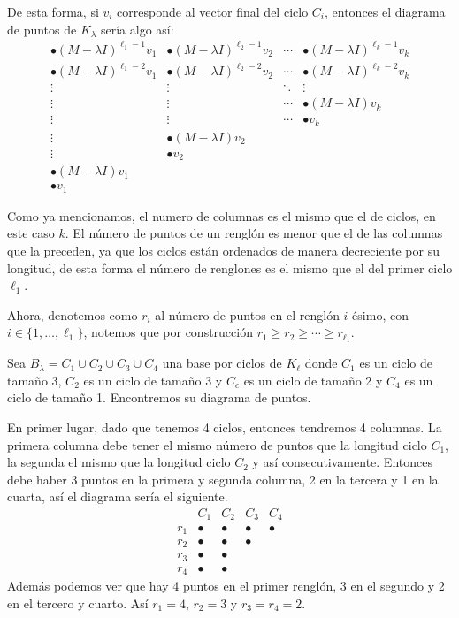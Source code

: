 De esta forma, si $v_i$ corresponde al vector final del ciclo $C_i$, entonces el diagrama de puntos de $K_\lambda
$ sería algo así:
\[
  \begin{array}{llll} 
    \bullet (M-\lambda I)^{\ell_1-1}v_1 & \bullet (M-\lambda I)^{\ell_2-1}v_2 & \cdots & \bullet (M-\lambda I)^{\ell_k-1}v_k  \\
    \bullet (M-\lambda I)^{\ell_1-2}v_1 & \bullet (M-\lambda I)^{\ell_2-2}v_2 & \cdots & \bullet (M-\lambda I)^{\ell_k-2}v_k  \\
    \vdots & \vdots & \ddots & \vdots \\
    \vdots & \vdots & \cdots & \bullet (M-\lambda I)v_k \\
    \vdots & \vdots & \cdots & \bullet v_k \\
    \vdots & \bullet (M-\lambda I)v_2 \\
    \vdots & \bullet v_2 \\
    \bullet (M-\lambda I)v_1 \\
    \bullet v_1 
  \end{array}
\]

Como ya mencionamos, el numero de columnas es el mismo que el de ciclos, en este caso $k$. El número de puntos de un renglón es menor que el de las columnas que la preceden, ya que los ciclos están ordenados de manera decreciente por su longitud, de esta forma el número de renglones es el mismo que el del primer ciclo $\ell_1$. 

Ahora, denotemos como $r_i$ al número de puntos en el renglón $i$-ésimo, con $i \in \{1,\ldots,\ell_1\}$, notemos que por construcción $r_1 \geq r_2 \geq \cdots \geq r_{\ell_1}$.

\begin{example}
  Sea $B_\lambda = C_1 \cup C_2 \cup C_3 \cup C_4$ una base por ciclos de $K_\ell$ donde $C_1$ es un ciclo de tamaño 3, $C_2$ es un ciclo de tamaño 3 y $C_c$ es un ciclo de tamaño 2 y $C_4$ es un ciclo de tamaño 1. Encontremos su diagrama de puntos.

  \examplesolution

  En primer lugar, dado que tenemos 4 ciclos, entonces tendremos 4 columnas. La primera columna debe tener el mismo número de puntos que la longitud ciclo $C_1$, la segunda el mismo que la longitud ciclo $C_2$ y así consecutivamente. Entonces debe haber 3 puntos en la primera y segunda columna, 2 en la tercera y 1 en la cuarta, así el diagrama sería el siguiente.
  \[
    \begin{array}{ccccc}
      & C_1 & C_2 & C_3 & C_4 \\
      r_1 & \bullet & \bullet & \bullet & \bullet \\
      r_2 & \bullet & \bullet & \bullet\\
      r_3 & \bullet & \bullet \\
      r_4 & \bullet & \bullet 
    \end{array}
  \]
  Además podemos ver que hay 4 puntos en el primer renglón, 3 en el segundo y 2 en el tercero y cuarto. Así $r_1 = 4$, $r_2 = 3$ y $r_3 = r_4 = 2$.
\end{example}

